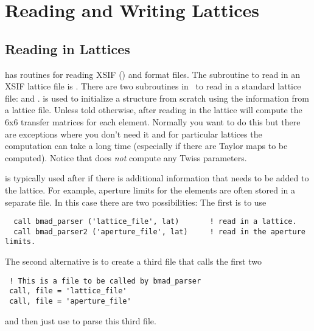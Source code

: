 \chapter{Reading and Writing Lattices}

\section{Reading in Lattices}
\label{s:lat.readin}


\bmad has routines for reading XSIF ()
and \bmad format files.
The subroutine to read in an XSIF lattice file is .
There are two subroutines in \bmad\ to read in a \bmad standard
lattice file:  and .
 is used to initialize a 
structure from scratch using the information from a lattice
file. Unless told otherwise, after reading in the lattice
 will compute the 6x6 transfer matrices for each
element. Normally you want to do this but there are exceptions where
you don't need it and for particular lattices the computation can take
a long time (especially if there are Taylor maps to be
computed). Notice that  does {\em not} compute any
Twiss parameters.

 is typically used after  if there is
additional information that needs to be added to the lattice. For
example, aperture limits for the elements are often stored in a
separate file. In this case there are two possibilities: The first is
to use 
\begin{verbatim}
  call bmad_parser ('lattice_file', lat)       ! read in a lattice.
  call bmad_parser2 ('aperture_file', lat)     ! read in the aperture limits.
\end{verbatim}
The second alternative is to create a third file that calls the first two
\begin{verbatim}
 ! This is a file to be called by bmad_parser
 call, file = 'lattice_file'
 call, file = 'aperture_file'
\end{verbatim}
and then just use  to parse this third file.


